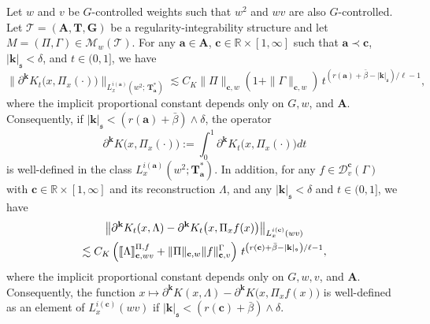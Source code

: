\documentclass[AHL,Unicode,longabstracts,published]{cedram}
\newcommand{\bbR}{\mathbb{R}}
\newcommand{\mfs}{\mathfrak{s}}
\newcommand{\bfa}{\mathbf{a}}
\newcommand{\bfc}{\mathbf{c}}
\newcommand{\bfA}{\mathbf{A}}
\newcommand{\bfT}{\mathbf{T}}
\newcommand{\bfG}{\mathbf{G}}
\newcommand{\bfk}{\mathbf{k}}
\newcommand{\mcD}{\mathcal{D}}
\newcommand{\scT}{\mathscr{T}}
\newcommand{\scM}{\mathscr{M}}
\newcommand{\llbracket}{\mathopen{[\mkern -2.7mu[}}
\newcommand{\rrbracket}{\mathclose{]\mkern -2.7mu]}}
\newcommand{\lb}{\llbracket}
\newcommand{\rb}{\rrbracket}
\begin{document}
\begin{lemm}\label{lem:KregularizePi}
Let $w$ and $v$ be $G$-controlled weights such that $w^2$ and $wv$ are also $G$-controlled. Let $\scT=(\bfA,\bfT,\bfG)$ be a regularity-integrability structure and let $M=(\Pi,\Gamma)\in\scM_w(\scT)$. For any $\bfa\in \bfA$, $\bfc\in\bbR\times[1,\infty]$ such that $\bfa\prec\bfc$, $|{\bfk}|_{\mfs}<\delta$, and $t\in(0,1]$, we have
\[
\big\|\partial^{\bfk}K_t\big(x,{\Pi}_x(\cdot)\big)\big\|_{L_x^{i(\bfa)}\left(w^2;\,\bfT_\bfa^*\right)}\lesssim C_K\|\Pi\|_{\bfc,w}(1+\|\Gamma\|_{\bfc,w})\,t^{\left(r(\bfa)+\bar\beta-|{\bfk}|_{\mfs}\right)/\ell-1},
\]
where the implicit proportional constant depends only on $G,w$, and $\bfA$. Consequently, if $|{\bfk}|_\mfs<(r(\bfa)+\bar\beta)\wedge\delta$, the operator
\[
\partial^{\bfk}K\big(x,\Pi_x(\cdot)\big):=\int_0^1\partial^{\bfk}K_t\big(x,\Pi_x(\cdot)\big)dt
\]
is well-defined in the class $L_x^{i(\bfa)}(w^2;\bfT_\bfa^*)$. In addition, for any $f\in\mcD_{v}^\bfc(\Gamma)$ with $\bfc\in\bbR\times[1,\infty]$ and its reconstruction $\Lambda$, and any $|{\bfk}|_{\mfs}<\delta$ and $t\in(0,1]$, we have
\begin{multline*}
\left\|\partial^{\bfk}K_t(x,\Lambda)-\partial^{\bfk}K_t\big(x,{\Pi}_xf(x)\big)\right\|_{L_x^{i(\bfc)}(wv)}
\\
\lesssim C_K\left(\lb\Lambda\rb_{\bfc,wv}^{\Pi,f}+\|\Pi\|_{\bfc,w}\|f\|_{\bfc,v}^\Gamma\right)\,t^{\left(r(\bfc)+\bar\beta-|{\bfk}|_{\mfs}\right)/\ell-1},
\end{multline*}
where the implicit proportional constant depends only on $G,w,v$, and $\bfA$. Consequently, the function $x\mapsto\partial^{\bfk}K(x,\Lambda)-\partial^{\bfk}K\big(x,{\Pi}_xf(x)\big)$ is well-defined as an element of $L_x^{i(\bfc)}(wv)$ if $|{\bfk}|_\mfs<(r(\bfc)+\bar\beta)\wedge\delta$.
\end{lemm}
\end{document}
